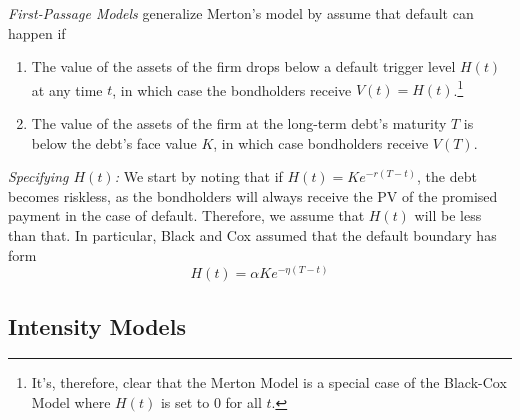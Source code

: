 \documentclass[a4paper,12pt]{scrartcl}
\begin{document}
\emph{First-Passage Models} generalize Merton's model by assume that
default can happen if
\begin{enumerate}
   \item The value of the assets of the firm drops below a default
      trigger level $H(t)$ at any time $t$, in which case the 
      bondholders receive $V(t) = H(t)$.\footnote{It's, therefore,
      clear that the Merton Model is a special case of the Black-Cox
   Model where $H(t)$ is set to 0 for all $t$.}
   \item The value of the assets of the firm at the long-term debt's
      maturity $T$ is below the debt's face value $K$, in which
      case bondholders receive $V(T)$.
\end{enumerate}
{\sl Specifying $H(t)$:} We start by noting that if $H(t) = 
Ke^{-r(T-t)}$, the debt becomes riskless, as the bondholders will 
always receive the PV of the promised payment in the case of default.
Therefore, we assume that $H(t)$ will be less than that. In particular,
Black and Cox assumed that the default boundary has form
\begin{equation}
   \label{defaultbound}
   H(t) = \alpha K e^{-\eta (T-t)}
\end{equation}

   
\newpage 
\subsection{Intensity Models}
\end{document}
